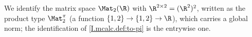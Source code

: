 We identify the matrix space $\Mat_2(\R)$ with $\R^{2\times2}=(\R^2)^2$, written as the product type $\Mat_2^{\pi}$ (a function $\{1,2\}\to\{1,2\}\to\R$), which carries a global norm; the identification of \cref{I.mcalc.def:to-pi} is the entrywise one.
